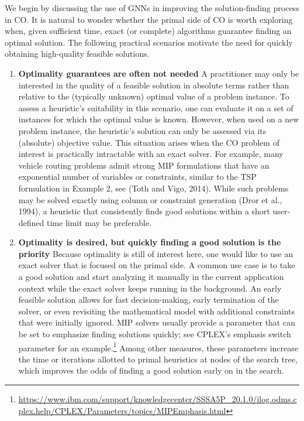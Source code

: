 \documentclass[10pt]{book}
\begin{document}
We begin by discussing the use of GNNs in improving the solution-finding process in CO. It is natural to wonder whether the primal side of CO is worth exploring when, given sufficient time, exact (or complete) algorithms guarantee finding an optimal solution. The following practical scenarios motivate the need for quickly obtaining high-quality feasible solutions.
\begin{enumerate}[label=\textbf{\alph*)}]
    \item \textbf{Optimality guarantees are often not needed} A practitioner may only be interested in the quality of a feasible solution in absolute terms rather than relative to the (typically unknown) optimal value of a problem instance. To assess a heuristic's suitability in this scenario, one can evaluate it on a set of instances for which the optimal value is known. However, when used on a new problem instance, the heuristic's solution can only be assessed via its (absolute) objective value. This situation arises when the CO problem of interest is practically intractable with an exact solver. For example, many vehicle routing problems admit strong MIP formulations that have an exponential number of variables or constraints, similar to the TSP formulation in Example 2, see (Toth and Vigo, 2014). While such problems may be solved exactly using column or constraint generation (Dror et al., 1994), a heuristic that consistently finds good solutions within a short user-defined time limit may be preferable.
    \item \textbf{Optimality is desired, but quickly finding a good solution is the priority} Because optimality is still of interest here, one would like to use an exact solver that is focused on the primal side. A common use case is to take a good solution and start analyzing it manually in the current application context while the exact solver keeps running in the background. An early feasible solution allows for fast decision-making, early termination of the solver, or even revisiting the mathematical model with additional constraints that were initially ignored. MIP solvers usually provide a parameter that can be set to emphasize finding solutions quickly; see CPLEX's emphasis switch parameter for an example.\footnote{\url{https://www.ibm.com/support/knowledgecenter/SSSA5P_20.1.0/ilog.odms.cplex.help/CPLEX/Parameters/topics/MIPEmphasis.html}} Among other measures, these parameters increase the time or iterations allotted to primal heuristics at nodes of the search tree, which improves the odds of finding a good solution early on in the search.
\end{enumerate}
\end{document}
